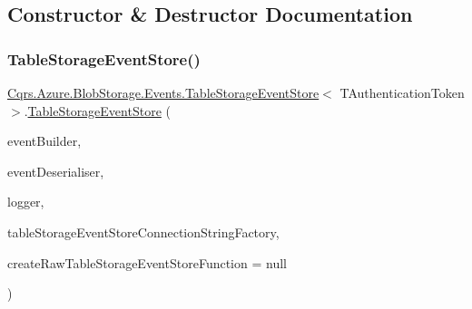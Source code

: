 \subsection{Constructor \& Destructor Documentation}
\mbox{\label{classCqrs_1_1Azure_1_1BlobStorage_1_1Events_1_1TableStorageEventStore_a25a65bc4a027b2a16ebf02e763ac3b95_a25a65bc4a027b2a16ebf02e763ac3b95}} 
\subsubsection{\texorpdfstring{Table\+Storage\+Event\+Store()}{TableStorageEventStore()}}
{\footnotesize\ttfamily \hyperlink{classCqrs_1_1Azure_1_1BlobStorage_1_1Events_1_1TableStorageEventStore}{Cqrs.\+Azure.\+Blob\+Storage.\+Events.\+Table\+Storage\+Event\+Store}$<$ T\+Authentication\+Token $>$.\hyperlink{classCqrs_1_1Azure_1_1BlobStorage_1_1Events_1_1TableStorageEventStore}{Table\+Storage\+Event\+Store} (\begin{DoxyParamCaption}\item[{\hyperlink{interfaceCqrs_1_1Events_1_1IEventBuilder}{I\+Event\+Builder}$<$ T\+Authentication\+Token $>$}]{event\+Builder,  }\item[{\hyperlink{interfaceCqrs_1_1Events_1_1IEventDeserialiser}{I\+Event\+Deserialiser}$<$ T\+Authentication\+Token $>$}]{event\+Deserialiser,  }\item[{I\+Logger}]{logger,  }\item[{\hyperlink{interfaceCqrs_1_1Azure_1_1BlobStorage_1_1ITableStorageStoreConnectionStringFactory}{I\+Table\+Storage\+Store\+Connection\+String\+Factory}}]{table\+Storage\+Event\+Store\+Connection\+String\+Factory,  }\item[{Func$<$ I\+Logger, \hyperlink{interfaceCqrs_1_1Azure_1_1BlobStorage_1_1ITableStorageStoreConnectionStringFactory}{I\+Table\+Storage\+Store\+Connection\+String\+Factory}, bool, \hyperlink{classCqrs_1_1Azure_1_1BlobStorage_1_1Events_1_1TableStorageEventStore_1_1RawTableStorageEventStore}{Raw\+Table\+Storage\+Event\+Store}$<$ T\+Authentication\+Token $>$ $>$}]{create\+Raw\+Table\+Storage\+Event\+Store\+Function = {\ttfamily null} }\end{DoxyParamCaption})}



